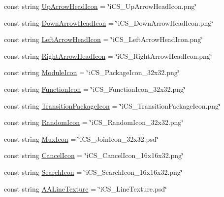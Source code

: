 \begin{DoxyCompactItemize}
\item 
const string \hyperlink{classi_c_s___editor_strings_a480527fa939299982127b28a9121cb04}{Up\+Arrow\+Head\+Icon} = \char`\"{}i\+C\+S\+\_\+\+Up\+Arrow\+Head\+Icon.\+png\char`\"{}
\item 
const string \hyperlink{classi_c_s___editor_strings_a980e77f75ffa63337ecb15b9594510e7}{Down\+Arrow\+Head\+Icon} = \char`\"{}i\+C\+S\+\_\+\+Down\+Arrow\+Head\+Icon.\+png\char`\"{}
\item 
const string \hyperlink{classi_c_s___editor_strings_a6f0e77119a660fffc6483faa2e0e80c3}{Left\+Arrow\+Head\+Icon} = \char`\"{}i\+C\+S\+\_\+\+Left\+Arrow\+Head\+Icon.\+png\char`\"{}
\item 
const string \hyperlink{classi_c_s___editor_strings_aae609372d1b0aeb705a10cfbcb9f220b}{Right\+Arrow\+Head\+Icon} = \char`\"{}i\+C\+S\+\_\+\+Right\+Arrow\+Head\+Icon.\+png\char`\"{}
\item 
const string \hyperlink{classi_c_s___editor_strings_af8a6ecbb9ee8b07e0fe82677b8ca5c64}{Module\+Icon} = \char`\"{}i\+C\+S\+\_\+\+Package\+Icon\+\_\+32x32.\+png\char`\"{}
\item 
const string \hyperlink{classi_c_s___editor_strings_a7e1d66c8e7078efe974b9899502c7af4}{Function\+Icon} = \char`\"{}i\+C\+S\+\_\+\+Function\+Icon\+\_\+32x32.\+png\char`\"{}
\item 
const string \hyperlink{classi_c_s___editor_strings_a5b5dbbcfa09c6b446fba9a33ab38e7c5}{Transition\+Package\+Icon} = \char`\"{}i\+C\+S\+\_\+\+Transition\+Package\+Icon.\+png\char`\"{}
\item 
const string \hyperlink{classi_c_s___editor_strings_a646229a3255e50adfbe125878665b921}{Random\+Icon} = \char`\"{}i\+C\+S\+\_\+\+Random\+Icon\+\_\+32x32.\+png\char`\"{}
\item 
const string \hyperlink{classi_c_s___editor_strings_ae5c2615a613257235005b834a92ecdef}{Mux\+Icon} = \char`\"{}i\+C\+S\+\_\+\+Join\+Icon\+\_\+32x32.\+psd\char`\"{}
\item 
const string \hyperlink{classi_c_s___editor_strings_aeccdbbc5d7e36f6f27d180b77b845199}{Cancel\+Icon} = \char`\"{}i\+C\+S\+\_\+\+Cancel\+Icon\+\_\+16x16x32.\+png\char`\"{}
\item 
const string \hyperlink{classi_c_s___editor_strings_ad1e20f2189e316f20c7f23a99bb59ab2}{Search\+Icon} = \char`\"{}i\+C\+S\+\_\+\+Search\+Icon\+\_\+16x16x32.\+png\char`\"{}
\item 
const string \hyperlink{classi_c_s___editor_strings_ac1af6f642c09870c1794d19d37a6d6e0}{A\+A\+Line\+Texture} = \char`\"{}i\+C\+S\+\_\+\+Line\+Texture.\+psd\char`\"{}

\end{DoxyCompactItemize}

